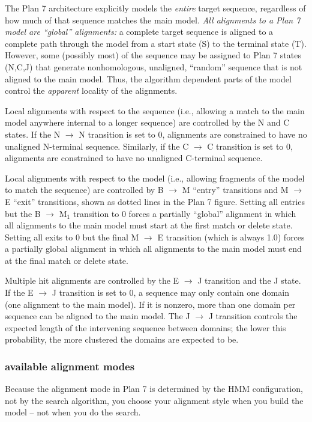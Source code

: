The Plan 7 architecture explicitly models the \emph{entire} target
sequence, regardless of how much of that sequence matches the main
model. \emph{All alignments to a Plan 7 model are ``global''
alignments:} a complete target sequence is aligned to a complete path
through the model from a start state (S) to the terminal state (T).
However, some (possibly most) of the sequence may be assigned to Plan
7 states (N,C,J) that generate nonhomologous, unaligned, ``random''
sequence that is not aligned to the main model.  Thus, the algorithm
dependent parts of the model control the \emph{apparent} locality of
the alignments.

Local alignments with respect to the sequence (i.e., allowing a match
to the main model anywhere internal to a longer sequence) are
controlled by the N and C states. If the N $\rightarrow$ N transition
is set to 0, alignments are constrained to have no unaligned
N-terminal sequence. Similarly, if the C $\rightarrow$ C transition is
set to 0, alignments are constrained to have no unaligned C-terminal
sequence.

Local alignments with respect to the model (i.e., allowing fragments
of the model to match the sequence) are controlled by B $\rightarrow$
M ``entry'' transitions and M $\rightarrow$ E ``exit'' transitions,
shown as dotted lines in the Plan 7 figure. Setting all entries but
the B $\rightarrow$ M$_1$ transition to 0 forces a partially
``global'' alignment in which all alignments to the main model must
start at the first match or delete state. Setting all exits to 0 but
the final M $\rightarrow$ E transition (which is always 1.0) forces a
partially global alignment in which all alignments to the main model
must end at the final match or delete state.

Multiple hit alignments are controlled by the E $\rightarrow$ J
transition and the J state. If the E $\rightarrow$ J transition is set
to 0, a sequence may only contain one domain (one alignment to the
main model). If it is nonzero, more than one domain per sequence can
be aligned to the main model. The J $\rightarrow$ J transition
controls the expected length of the intervening sequence between
domains; the lower this probability, the more clustered the domains
are expected to be.

\subsubsection{available alignment modes}

Because the alignment mode in Plan 7 is determined by the HMM
configuration, not by the search algorithm, you choose your alignment
style when you build the model -- not when you do the search.

